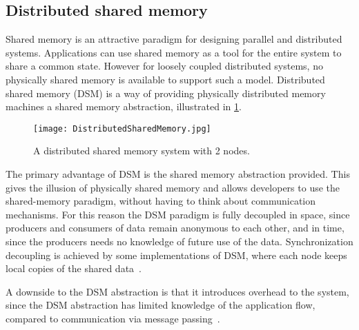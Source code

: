 \subsection{Distributed shared memory}\label{sec:DSM}

Shared memory is an attractive paradigm for designing parallel and distributed systems. Applications can use shared memory as a tool for the entire system to share a common state. However for loosely coupled distributed systems, no physically shared memory is available to support such a model. Distributed shared memory (DSM) is a way of providing physically distributed memory machines a shared memory abstraction, illustrated in \cref{fig:distributedSharedMemory}.

\begin{figure}
	\centering
	\texttt{[image: DistributedSharedMemory.jpg]} 
	\caption[Distributed Computing System with 2 nodes]{
		\label{fig:distributedSharedMemory} 
		\footnotesize{%
			A distributed shared memory system with 2 nodes.
		}
	}
\end{figure}

The primary advantage of DSM is the shared memory abstraction provided. This gives the illusion of physically shared memory and allows developers to use the shared-memory paradigm, without having to think about communication mechanisms. For this reason the DSM paradigm is fully decoupled in space, since producers and consumers of data remain anonymous to each other, and in time, since the producers needs no knowledge of future use of the data. Synchronization decoupling is achieved by some implementations of DSM, where each node keeps local copies of the shared data~\cite{guedes1993distributed}.

A downside to the DSM abstraction is that it introduces overhead to the system, since the DSM abstraction has limited knowledge of the application flow, compared to communication via message passing~\cite{lu1995message}. 

 



